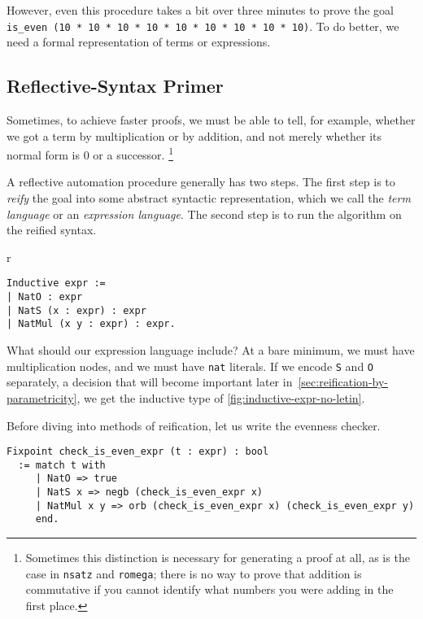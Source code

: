 However, even this procedure takes a bit over three minutes to prove the goal \texttt{is_even (10 * 10 * 10 * 10 * 10 * 10 * 10 * 10 * 10)}.
To do better, we need a formal representation of terms or expressions.

\subsection{Reflective-Syntax Primer}
Sometimes, to achieve faster proofs, we must be able to tell, for example, whether we got a term by multiplication or by addition, and not merely whether its normal form is 0 or a successor.%
\footnote{%
  Sometimes this distinction is necessary for generating a proof at all, as is the case in \texttt{nsatz} and \texttt{romega}; there is no way to prove that addition is commutative if you cannot identify what numbers you were adding in the first place.%
}

A reflective automation procedure generally has two steps.
The first step is to \emph{reify} the goal into some abstract syntactic representation, which we call the \emph{term language} or an \emph{expression language}.
The second step is to run the algorithm on the reified syntax.

\begin{wrapfigure}[6]{r}{}
\begin{verbatim}
Inductive expr :=
| NatO : expr
| NatS (x : expr) : expr
| NatMul (x y : expr) : expr.
\end{verbatim}
\caption{Simple Expressions}\label{fig:inductive-expr-no-letin}
\end{wrapfigure}
What should our expression language include?
At a bare minimum, we must have multiplication nodes, and we must have \texttt{nat} literals.
If we encode \texttt{S} and \texttt{O} separately, a decision that will become important later in~\autoref{sec:reification-by-parametricity}, we get the inductive type of \autoref{fig:inductive-expr-no-letin}.

Before diving into methods of reification, let us write the evenness checker.
\begin{verbatim}
Fixpoint check_is_even_expr (t : expr) : bool
  := match t with
     | NatO => true
     | NatS x => negb (check_is_even_expr x)
     | NatMul x y => orb (check_is_even_expr x) (check_is_even_expr y)
     end.
\end{verbatim}

